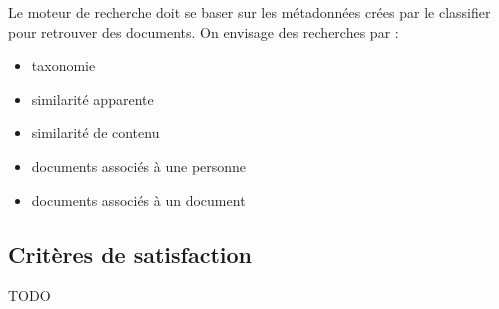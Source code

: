 Le moteur de recherche doit se baser sur les métadonnées crées par le classifier pour retrouver des documents.
On envisage des recherches par :
\begin {itemize}
\item taxonomie
\item similarité apparente
\item similarité de contenu
\item documents associés à une personne
\item documents associés à un document
\end {itemize}


\subsection {Critères de satisfaction}
TODO


